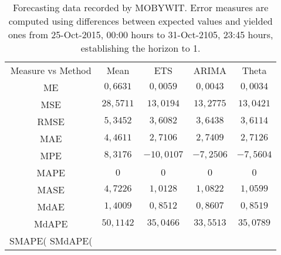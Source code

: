 \begin{table}
{\scriptsize
\centering
\begin{tabular}{|c|c|c|c|c|}
\hline
Measure vs Method &Mean &ETS &ARIMA &Theta\\
ME &$0,6631$ & $0,0059$ & $0,0043$ & \bf{$0,0034$} & \\
MSE &$28,5711$ & \bf{$13,0194$} & $13,2775$ & $13,0421$ & \\
RMSE &$5,3452$ & \bf{$3,6082$} & $3,6438$ & $3,6114$ & \\
MAE &$4,4611$ & \bf{$2,7106$} & $2,7409$ & $2,7126$ & \\
MPE &$8,3176$ & \bf{$-10,0107$} & $-7,2506$ & $-7,5604$ & \\
MAPE &\bf{$0$} & \bf{$0$} & \bf{$0$} & \bf{$0$} & \\
MASE &$4,7226$ & \bf{$1,0128$} & $1,0822$ & $1,0599$ & \\
MdAE &$1,4009$ & \bf{$0,8512$} & $0,8607$ & $0,8519$ & \\
MdAPE &$50,1142$ & $35,0466$ & \bf{$33,5513$} & $35,0789$ & \\
 SMAPE(%
 SMdAPE(%

\hline
\end{tabular}
}
\caption{Forecasting data recorded by MOBYWIT. Error measures are computed using differences between expected values and yielded ones from 25-Oct-2015, 00:00 hours to 31-Oct-2105, 23:45 hours, establishing the horizon to 1.}
\label{tab:forecasting}
\end{table}
